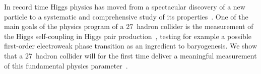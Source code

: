 
\label{sec8:cubicetc}



In record time Higgs physics has moved from a spectacular discovery of
a new particle to a systematic and comprehensive study of its
properties~\cite{Dawson:2018dcd}. 
One of the main goals of the physics program of a 27~\UTeV hadron 
collider 
is the measurement of the Higgs self-coupling in Higgs pair
production~\cite{Baur:2003gp,Kling:2016lay,Goncalves:2018yva,Homiller:2018dgu,Barger:2013jfa,Barr:2014sga},
testing for example a possible first-order electroweak
phase transition as an ingredient to
baryogenesis. 
We show that a 27~\UTeV hadron collider will for the first time 
deliver a meaningful measurement of this fundamental physics 
parameter~\cite{Biekotter:2018jzu}. \medskip

